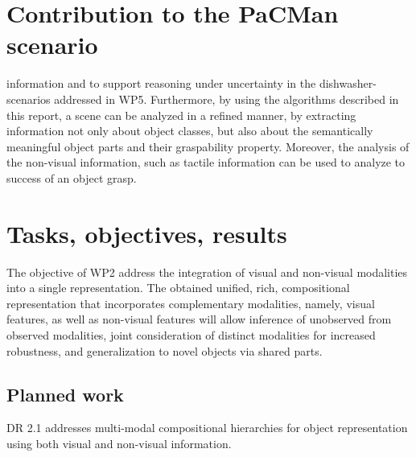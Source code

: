 \documentclass[a4paper,11pt,pdf]{pacmanreport}
\begin{document}
\section*{Contribution to the PaCMan scenario}

information and to support reasoning under uncertainty in the 
dishwasher-scenarios addressed in WP5. Furthermore, by using the algorithms 
described in this report, a scene can be analyzed in a refined manner, by 
extracting information not only about object classes, but also about the 
semantically meaningful object parts and their graspability property. Moreover, 
the analysis of the non-visual information, such as tactile information can be 
used to analyze to success of an object grasp.

\newpage

\section{Tasks, objectives, results}

The objective of WP2 address the integration of visual and non-visual modalities 
into a single representation. The obtained unified, rich, compositional 
representation that incorporates complementary modalities, namely, visual 
features, as well as non-visual features will allow inference of unobserved from 
observed modalities, joint consideration of distinct modalities for increased 
robustness, and generalization to novel objects via shared parts.

\subsection{Planned work}

DR 2.1 addresses multi-modal compositional hierarchies for object representation using both visual and non-visual information. 
\end{document}
